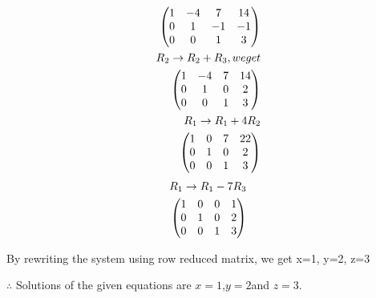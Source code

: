 \documentclass[two column]{article}
\begin{document}
\begin{enumerate}
\begin{align}
                  \begin{pmatrix}1&-4&7&14\\0&1&-1&-1\\0&0&1&3\end{pmatrix}\\
                  R_2 \rightarrow R_2+R_3,we get \\
                  \begin{pmatrix}1&-4&7&14\\0&1&0&2\\0&0&1&3\end{pmatrix}\\
                  R_1 \rightarrow R_1+4R_2\\
                  \begin{pmatrix}1&0&7&22\\0&1&0&2\\0&0&1&3\end{pmatrix}
                  \end{align}
                  \begin{align}
                  R_1 \rightarrow R_1- 7R_3\\
                  \begin{pmatrix}1&0&0&1\\0&1&0&2\\0&0&1&3\end{pmatrix}
                  \end{align}
                  
                  By rewriting the system using row reduced matrix, we get
                  x=1,
                  y=2,
                  z=3
                     \end{enumerate}
                     
                     
                  $\therefore$ Solutions of the given equations are $x=1$,$y=2 $and $ z=3$. 
                    
                    
                    
\end{document}
